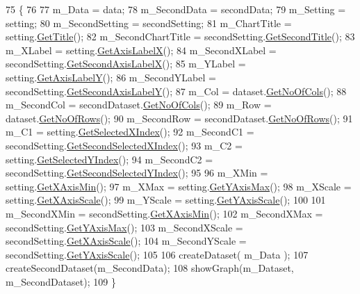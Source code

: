 \begin{DoxyCode}
75                                          \{
76 
77         m\_Data = data;
78         m\_SecondData = secondData;
79         m\_Setting = setting;
80         m\_SecondSetting = secondSetting;
81         m\_ChartTitle = setting.\hyperlink{class_data_attribute_ade9747a192ba22fe1020e874bff6a48c}{GetTitle}();
82         m\_SecondChartTitle = secondSetting.\hyperlink{class_data_attribute_a4079522c93025fce7569eaed585f4aeb}{GetSecondTitle}();
83         m\_XLabel = setting.\hyperlink{class_data_attribute_aecb451704a87d77dd80dbad8a19099d1}{GetAxisLabelX}();
84         m\_SecondXLabel = secondSetting.\hyperlink{class_data_attribute_a8ace4cb1fee9e2abeabe3efc9a190c8f}{GetSecondAxisLabelX}();
85         m\_YLabel = setting.\hyperlink{class_data_attribute_af5f68794cd0195d42135d5e48120ccc0}{GetAxisLabelY}();
86         m\_SecondYLabel = secondSetting.\hyperlink{class_data_attribute_a6efb7e067317898feefbbf6bd472b998}{GetSecondAxisLabelY}();
87         m\_Col = dataset.\hyperlink{class_dataset_ab922bef50c8aa1531de8704731779246}{GetNoOfCols}();
88         m\_SecondCol = secondDataset.\hyperlink{class_dataset_ab922bef50c8aa1531de8704731779246}{GetNoOfCols}();
89         m\_Row = dataset.\hyperlink{class_dataset_a91257a605317576e87e1c32e54739e51}{GetNoOfRows}();
90         m\_SecondRow = secondDataset.\hyperlink{class_dataset_a91257a605317576e87e1c32e54739e51}{GetNoOfRows}();
91         m\_C1 = setting.\hyperlink{class_data_attribute_a0f4a54973bc44b0526f78bda945dc81b}{GetSelectedXIndex}();
92         m\_SecondC1 = secondSetting.\hyperlink{class_data_attribute_a7f501790eee650ddf9ac17c4f63a3995}{GetSecondSelectedXIndex}();
93         m\_C2 = setting.\hyperlink{class_data_attribute_a82e7519853d9f470ea183dd0c39a03d6}{GetSelectedYIndex}();
94         m\_SecondC2 = secondSetting.\hyperlink{class_data_attribute_a6f61ad05915f4aa31ad3dba00596da64}{GetSecondSelectedYIndex}();
95         
96         m\_XMin = setting.\hyperlink{class_data_attribute_afa9da883abc4abad5f64c045de114c50}{GetXAxisMin}();
97         m\_XMax = setting.\hyperlink{class_data_attribute_a81243eb8f7008e05e74b0f3571d2f08d}{GetYAxisMax}();
98         m\_XScale = setting.\hyperlink{class_data_attribute_a5a1de25600487aa958a19ce01151fea4}{GetXAxisScale}();
99         m\_YScale = setting.\hyperlink{class_data_attribute_a95259727ce91efc0e0eaa28487d944c5}{GetYAxisScale}();
100 
101         m\_SecondXMin = secondSetting.\hyperlink{class_data_attribute_afa9da883abc4abad5f64c045de114c50}{GetXAxisMin}();
102         m\_SecondXMax = secondSetting.\hyperlink{class_data_attribute_a81243eb8f7008e05e74b0f3571d2f08d}{GetYAxisMax}();
103         m\_SecondXScale = secondSetting.\hyperlink{class_data_attribute_a5a1de25600487aa958a19ce01151fea4}{GetXAxisScale}();
104         m\_SecondYScale = secondSetting.\hyperlink{class_data_attribute_a95259727ce91efc0e0eaa28487d944c5}{GetYAxisScale}();
105         
106         createDataset( m\_Data );
107         createSecondDataset(m\_SecondData);
108         showGraph(m\_Dataset, m\_SecondDataset);
109     \}  
\end{DoxyCode}
